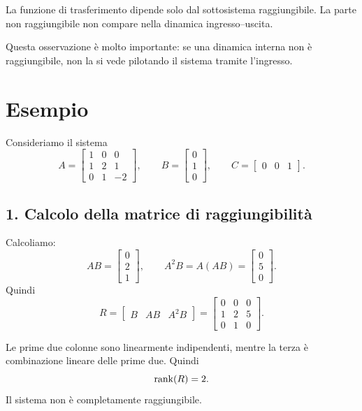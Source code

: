 \begin{osservazione}
La funzione di trasferimento dipende solo dal sottosistema raggiungibile.  
La parte non raggiungibile non compare nella dinamica ingresso--uscita.
\end{osservazione}

Questa osservazione è molto importante: se una dinamica interna non è raggiungibile, non la si vede pilotando il sistema tramite l’ingresso.

\section{Esempio}

Consideriamo il sistema
\[
A=
\begin{bmatrix}
1 & 0 & 0\\
1 & 2 & 1\\
0 & 1 & -2
\end{bmatrix},
\qquad
B=
\begin{bmatrix}
0\\
1\\
0
\end{bmatrix},
\qquad
C=
\begin{bmatrix}
0 & 0 & 1
\end{bmatrix}.
\]

\subsection*{1. Calcolo della matrice di raggiungibilità}

Calcoliamo:
\[
AB=
\begin{bmatrix}
0\\
2\\
1
\end{bmatrix},
\qquad
A^2B=A(AB)=
\begin{bmatrix}
0\\
5\\
0
\end{bmatrix}.
\]
Quindi
\[
R=
\begin{bmatrix}
B & AB & A^2B
\end{bmatrix}
=
\begin{bmatrix}
0 & 0 & 0\\
1 & 2 & 5\\
0 & 1 & 0
\end{bmatrix}.
\]

Le prime due colonne sono linearmente indipendenti, mentre la terza è combinazione lineare delle prime due. Quindi
\[
\rank(R)=2.
\]
Il sistema non è completamente raggiungibile.

